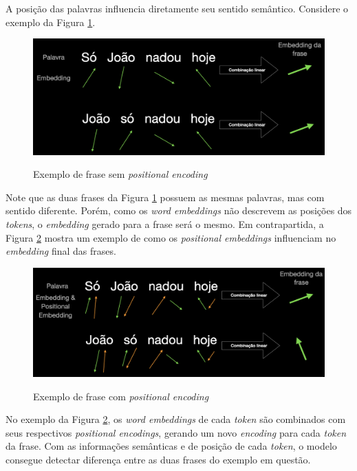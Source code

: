 A posição das palavras influencia diretamente seu sentido semântico. Considere o exemplo da Figura \ref{fig:concepts:wordEmbedding}.

\begin{figure}[H]
    \centering
    \caption{Exemplo de frase sem \textit{positional encoding}}
    \includegraphics[scale=0.4]{imagens/conceitos/word_embedding.png}
    \label{fig:concepts:wordEmbedding}
\end{figure}

Note que as duas frases da Figura \ref{fig:concepts:wordEmbedding} possuem as mesmas palavras, mas com sentido diferente. Porém, como os \textit{word embeddings} não descrevem as posições dos \textit{tokens}, o \textit{embedding} gerado para a frase será o mesmo. Em contrapartida, a Figura \ref{fig:concepts:wordAndPosEmbedding} mostra um exemplo de como os \textit{positional embeddings} influenciam no \textit{embedding} final das frases.

\begin{figure}[H]
    \centering
    \caption{Exemplo de frase com \textit{positional encoding}}
    \includegraphics[scale=0.4]{imagens/conceitos/word_n_positional_embeddings.png}
    \label{fig:concepts:wordAndPosEmbedding}
\end{figure}

No exemplo da Figura \ref{fig:concepts:wordAndPosEmbedding}, os \textit{word embeddings} de cada \textit{token} são combinados com seus respectivos \textit{positional encodings}, gerando um novo \textit{encoding} para cada \textit{token} da frase. Com as informações semânticas e de posição de cada \textit{token}, o modelo consegue detectar diferença entre as duas frases do exemplo em questão.

